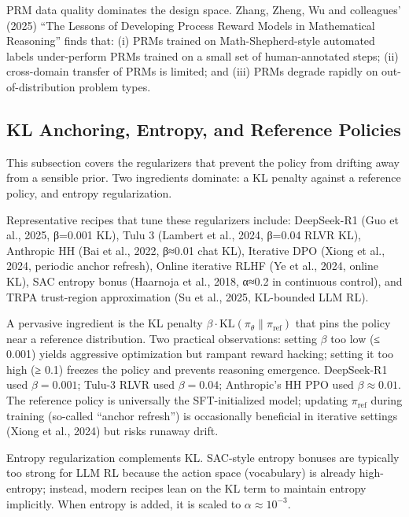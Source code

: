 PRM data quality dominates the design space. Zhang, Zheng, Wu and colleagues' (2025) ``The Lessons of Developing Process Reward Models in Mathematical Reasoning'' finds that: (i) PRMs trained on Math-Shepherd-style automated labels under-perform PRMs trained on a small set of human-annotated steps; (ii) cross-domain transfer of PRMs is limited; and (iii) PRMs degrade rapidly on out-of-distribution problem types.

\subsection{KL Anchoring, Entropy, and Reference Policies}\label{kl-anchoring-entropy-and-reference-policies}

This subsection covers the regularizers that prevent the policy from drifting away from a sensible prior. Two ingredients dominate: a KL penalty against a reference policy, and entropy regularization.

Representative recipes that tune these regularizers include: DeepSeek-R1 (Guo et al., 2025, β=0.001 KL), Tulu 3 (Lambert et al., 2024, β=0.04 RLVR KL), Anthropic HH (Bai et al., 2022, β≈0.01 chat KL), Iterative DPO (Xiong et al., 2024, periodic anchor refresh), Online iterative RLHF (Ye et al., 2024, online KL), SAC entropy bonus (Haarnoja et al., 2018, α≈0.2 in continuous control), and TRPA trust-region approximation (Su et al., 2025, KL-bounded LLM RL).

A pervasive ingredient is the KL penalty \(\beta \cdot \mathrm{KL}(\pi_\theta \| \pi_{\mathrm{ref}})\) that pins the policy near a reference distribution. Two practical observations: setting \(\beta\) too low (≤ 0.001) yields aggressive optimization but rampant reward hacking; setting it too high (≥ 0.1) freezes the policy and prevents reasoning emergence. DeepSeek-R1 used \(\beta=0.001\); Tulu-3 RLVR used \(\beta = 0.04\); Anthropic's HH PPO used \(\beta \approx 0.01\). The reference policy is universally the SFT-initialized model; updating \(\pi_{\mathrm{ref}}\) during training (so-called ``anchor refresh'') is occasionally beneficial in iterative settings (Xiong et al., 2024) but risks runaway drift.

Entropy regularization complements KL. SAC-style entropy bonuses are typically too strong for LLM RL because the action space (vocabulary) is already high-entropy; instead, modern recipes lean on the KL term to maintain entropy implicitly. When entropy is added, it is scaled to \(\alpha \approx 10^{-3}\).

